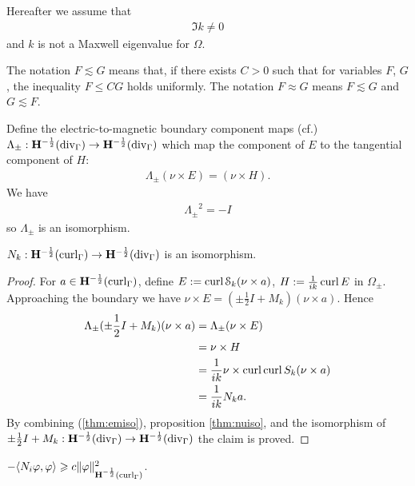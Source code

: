 Hereafter we assume that 
\begin{align}\label{eq:kconstraint}
  \Im k\not=0
\end{align}
and $k$ is not a Maxwell eigenvalue for $\Omega$.

The notation $F\lesssim G$ means that, if there exists $C>0$ such that for
variables $F$, $G$, the inequality $F\leqslant CG$ holds uniformly. The 
notation $F\approx G$ means $F\lesssim G$ and $G\lesssim F$. 

Define the electric-to-magnetic boundary component maps (cf.\citet{colton3}) $\Lambda_\pm:{\bf H}^{-\frac{1}{2}}(\operatorname{div}_\Gamma)\rightarrow{\bf H}^{-\frac{1}{2}}(\operatorname{div}_\Gamma)$ which map the component of $E$ to the tangential component of $H$:
\begin{align*}
  \Lambda_\pm(\nu\times E)=(\nu\times H).
\end{align*}
We have 
\begin{align}\label{thm:emiso}
  {\Lambda_\pm}^2 = -I
\end{align}
so $\Lambda_\pm$ is an isomorphism.

\begin{prp}\label{thm:Niso}
$N_k:{\bf H}^{-\frac{1}{2}}(\operatorname{curl}_\Gamma)\rightarrow{\bf H}^{-\frac{1}{2}}(\operatorname{div}_\Gamma)$ is an isomorphism. 
\end{prp}

\begin{proof}
  For $a\in{\bf H}^{-\frac{1}{2}}(\operatorname{curl}_\Gamma)$, define $E:=\operatorname{curl}\mathcal{S}_k (\nu\times a)$, $H:=\frac{1}{ik}\operatorname{curl} E$ in $\Omega_\pm$. Approaching the boundary we have $\nu\times E=(\pm\frac{1}{2}I+M_k)(\nu\times a)$. Hence
  \begin{align*}
    \Lambda_\pm(\pm\frac{1}{2}I+M_k)(\nu\times a) &= \Lambda_\pm(\nu\times E) \\
    &= \nu\times H \\ 
    &= \frac{1}{ik}\nu\times\operatorname{curl}\operatorname{curl} S_k (\nu\times a) \\ 
    &= \frac{1}{ik} N_k a.
  \end{align*}
  By combining (\ref{thm:emiso}), proposition \ref{thm:nuiso}, and the isomorphism of $\pm\frac{1}{2}I+M_k:{\bf H}^{-\frac{1}{2}}(\operatorname{div}_\Gamma)\rightarrow{\bf H}^{-\frac{1}{2}}(\operatorname{div}_\Gamma)$ the claim is proved. 
\end{proof}

\begin{prp}
  $-\langle N_i\varphi,\varphi\rangle \geqslant c \|\varphi\|_{{\bf H}^{-\frac{1}{2}}(\operatorname{curl}_\Gamma)}^2$.
\end{prp}


